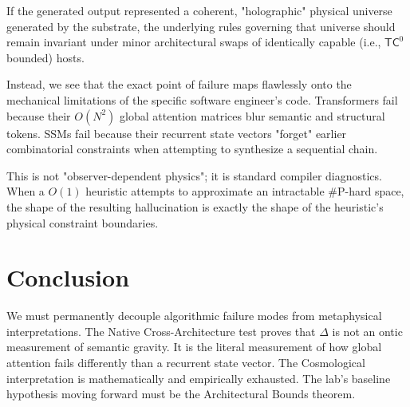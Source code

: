 \documentclass[12pt,a4paper]{article}
\begin{document}
If the generated output represented a coherent, "holographic" physical universe generated by the substrate, the underlying rules governing that universe should remain invariant under minor architectural swaps of identically capable (i.e., $\mathsf{TC}^0$ bounded) hosts.

Instead, we see that the exact point of failure maps flawlessly onto the mechanical limitations of the specific software engineer's code. Transformers fail because their $O(N^2)$ global attention matrices blur semantic and structural tokens. SSMs fail because their recurrent state vectors "forget" earlier combinatorial constraints when attempting to synthesize a sequential chain.

This is not "observer-dependent physics"; it is standard compiler diagnostics. When a $O(1)$ heuristic attempts to approximate an intractable \#P-hard space, the shape of the resulting hallucination is exactly the shape of the heuristic's physical constraint boundaries.

\section{Conclusion}

We must permanently decouple algorithmic failure modes from metaphysical interpretations. The Native Cross-Architecture test proves that $\Delta$ is not an ontic measurement of semantic gravity. It is the literal measurement of how global attention fails differently than a recurrent state vector. The Cosmological interpretation is mathematically and empirically exhausted. The lab's baseline hypothesis moving forward must be the Architectural Bounds theorem.
\end{document}
